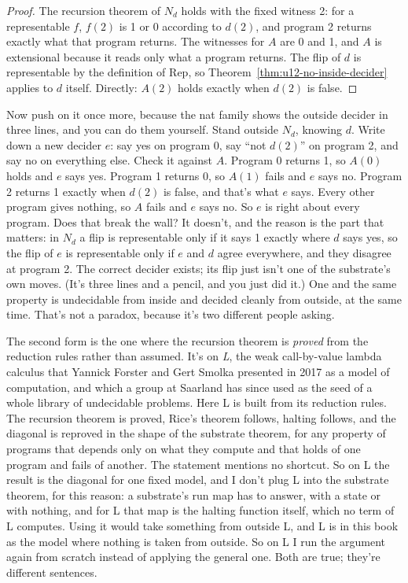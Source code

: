 \documentclass[11pt,twoside]{article}
\theoremstyle{thielethm}
\theoremstyle{thieledef}
\theoremstyle{thieledef}
\theoremstyle{thieledef}
\theoremstyle{thielethm}
\theoremstyle{thieleobs}
\theoremstyle{thielethm}
\begin{document}
\begin{proof}
The recursion theorem of $N_d$ holds with the fixed witness 2: for a representable $f$,
$f(2)$ is 1 or 0 according to $d(2)$, and program 2 returns exactly what that program
returns. The witnesses for $A$ are 0 and 1, and $A$ is extensional because it reads only what a
program returns. The flip of $d$ is representable by the
definition of $\mathrm{Rep}$, so Theorem~\ref{thm:u12-no-inside-decider} applies to $d$ itself. Directly:
$A(2)$ holds exactly when $d(2)$ is false.
\end{proof}

Now push on it once more, because the nat family shows the outside decider in three lines,
and you can do them yourself. Stand outside $N_d$, knowing $d$. Write down a new decider
$e$: say yes on program 0, say ``not $d(2)$'' on program 2, and say no on everything else.
Check it against $A$. Program 0 returns 1, so $A(0)$ holds and $e$ says yes. Program 1
returns 0, so $A(1)$ fails and $e$ says no. Program 2 returns 1 exactly when $d(2)$ is false,
and that's what $e$ says. Every other program gives nothing, so $A$ fails and $e$ says no.
So $e$ is right about every program. Does that break the wall? It doesn't, and the reason is the part that
matters: in $N_d$ a flip is representable only if it says 1 exactly where $d$ says yes, so
the flip of $e$ is representable only if $e$ and $d$ agree everywhere, and they disagree at
program 2. The correct decider exists; its flip just isn't one of the substrate's own moves.
(It's three lines and a pencil, and you just did it.) One and the same property is undecidable from inside and decided cleanly from outside, at the
same time. That's not a paradox, because it's two different people asking.

The second form is the one where the recursion theorem is \emph{proved} from the reduction rules rather than assumed.
It's on \emph{L}, the weak call-by-value lambda calculus that Yannick Forster and Gert Smolka presented in
2017 as a model of computation, and which a group at Saarland has since used as the
seed of a whole library of undecidable problems. Here L is built from its reduction rules. The recursion theorem is proved, Rice's theorem follows, halting
follows, and the diagonal is reproved in the shape of the substrate
theorem, for any property of programs that depends only
on what they compute and that holds of one program and fails of another. The statement
mentions no shortcut. So on L the result is the diagonal for one fixed model, and I don't plug L into the
substrate theorem, for this reason: a substrate's run map has to answer, with a state or with nothing, and for L that map is the halting function itself, which no term of L computes. Using it would take something from outside L, and L is in this book as the model where nothing is taken from outside. So on L I run the argument again from
scratch instead of applying the general one. Both are true; they're different sentences.
\end{document}
